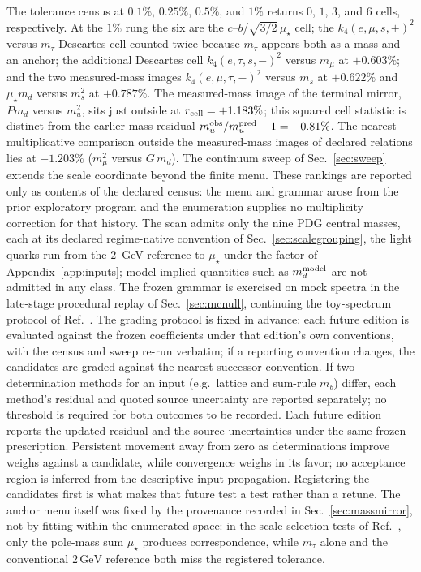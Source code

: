 \documentclass[aps,twocolumn,superscriptaddress,nofootinbib,floatfix]{revtex4-2}
\newcommand{\mstar}{\mu_\star}
\begin{document}
The tolerance census at $0.1\%$, $0.25\%$, $0.5\%$, and $1\%$ returns $0$, $1$, $3$, and $6$ cells, respectively. At the $1\%$ rung the six are the $c$--$b$/$\sqrt{3/2}\,\mstar$ cell; the $k_4(e,\mu,s,+)^2$ versus $m_\tau$ Descartes cell counted twice because $m_\tau$ appears both as a mass and an anchor; the additional Descartes cell $k_4(e,\tau,s,-)^2$ versus $m_\mu$ at $+0.603\%$; and the two measured-mass images $k_4(e,\mu,\tau,-)^2$ versus $m_s$ at $+0.622\%$ and $\mstar m_d$ versus $m_s^2$ at $+0.787\%$. The measured-mass image of the terminal mirror, $P m_d$ versus $m_u^2$, sits just outside at $r_{\rm cell}=+1.183\%$; this squared cell statistic is distinct from the earlier mass residual $m_u^{\rm obs}/m_u^{\rm pred}-1=-0.81\%$. The nearest multiplicative comparison outside the measured-mass images of declared relations lies at $-1.203\%$ ($m_\mu^2$ versus $G\,m_d$). The continuum sweep of Sec.~\ref{sec:sweep} extends the scale coordinate beyond the finite menu. These rankings are reported only as contents of the declared census: the menu and grammar arose from the prior exploratory program and the enumeration supplies no multiplicity correction for that history. The scan admits only the nine PDG central masses, each at its declared regime-native convention of Sec.~\ref{sec:scalegrouping}, the light quarks run from the $2$~GeV reference to $\mstar$ under the factor of Appendix~\ref{app:inputs}; model-implied quantities such as $m_d^{\rm model}$ are not admitted in any class. The frozen grammar is exercised on mock spectra in the late-stage procedural replay of Sec.~\ref{sec:mcnull}, continuing the toy-spectrum protocol of Ref.~\cite{BrilliantAPPB}. The grading protocol is fixed in advance: each future edition is evaluated against the frozen coefficients under that edition's own conventions, with the census and sweep re-run verbatim; if a reporting convention changes, the candidates are graded against the nearest successor convention. If two determination methods for an input (e.g.\ lattice and sum-rule $m_b$) differ, each method's residual and quoted source uncertainty are reported separately; no threshold is required for both outcomes to be recorded. Each future edition reports the updated residual and the source uncertainties under the same frozen prescription. Persistent movement away from zero as determinations improve weighs against a candidate, while convergence weighs in its favor; no acceptance region is inferred from the descriptive input propagation. Registering the candidates first is what makes that future test a test rather than a retune. The anchor menu itself was fixed by the provenance recorded in Sec.~\ref{sec:massmirror}, not by fitting within the enumerated space: in the scale-selection tests of Ref.~\cite{BrilliantAPPB}, only the pole-mass sum $\mstar$ produces correspondence, while $m_\tau$ alone and the conventional $2\,\mathrm{GeV}$ reference both miss the registered tolerance.
\end{document}
